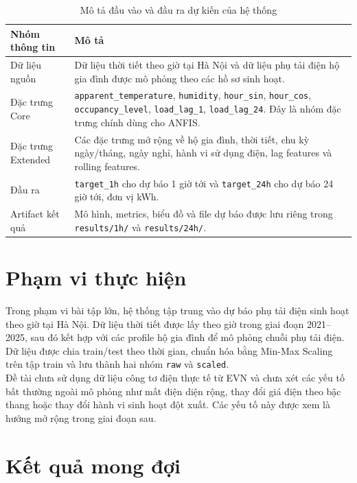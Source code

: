 \begin{table}[H]
  \centering
  \begin{tabular}{p{4cm} p{9cm}}
    \toprule
    \textbf{Nhóm thông tin} & \textbf{Mô tả} \\
    \midrule
    Dữ liệu nguồn & Dữ liệu thời tiết theo giờ tại Hà Nội và dữ liệu phụ tải điện hộ gia đình được mô phỏng theo các hồ sơ sinh hoạt. \\
    Đặc trưng Core & \texttt{apparent\_temperature}, \texttt{humidity}, \texttt{hour\_sin}, \texttt{hour\_cos}, \texttt{occupancy\_level}, \texttt{load\_lag\_1}, \texttt{load\_lag\_24}. Đây là nhóm đặc trưng chính dùng cho ANFIS. \\
    Đặc trưng Extended & Các đặc trưng mở rộng về hộ gia đình, thời tiết, chu kỳ ngày/tháng, ngày nghỉ, hành vi sử dụng điện, lag features và rolling features. \\
    Đầu ra & \texttt{target\_1h} cho dự báo 1 giờ tới và \texttt{target\_24h} cho dự báo 24 giờ tới, đơn vị kWh. \\
    Artifact kết quả & Mô hình, metrics, biểu đồ và file dự báo được lưu riêng trong \texttt{results/1h/} và \texttt{results/24h/}. \\
    \bottomrule
  \end{tabular}
  \caption{Mô tả đầu vào và đầu ra dự kiến của hệ thống}
\end{table}

\section{Phạm vi thực hiện}

Trong phạm vi bài tập lớn, hệ thống tập trung vào dự báo phụ tải điện sinh hoạt theo giờ tại Hà Nội. Dữ liệu thời tiết được lấy theo giờ trong giai đoạn 2021--2025, sau đó kết hợp với các profile hộ gia đình để mô phỏng chuỗi phụ tải điện. Dữ liệu được chia train/test theo thời gian, chuẩn hóa bằng Min-Max Scaling trên tập train và lưu thành hai nhóm \texttt{raw} và \texttt{scaled}.
\\
Đề tài chưa sử dụng dữ liệu công tơ điện thực tế từ EVN và chưa xét các yếu tố bất thường ngoài mô phỏng như mất điện diện rộng, thay đổi giá điện theo bậc thang hoặc thay đổi hành vi sinh hoạt đột xuất. Các yếu tố này được xem là hướng mở rộng trong giai đoạn sau.

\section{Kết quả mong đợi}

